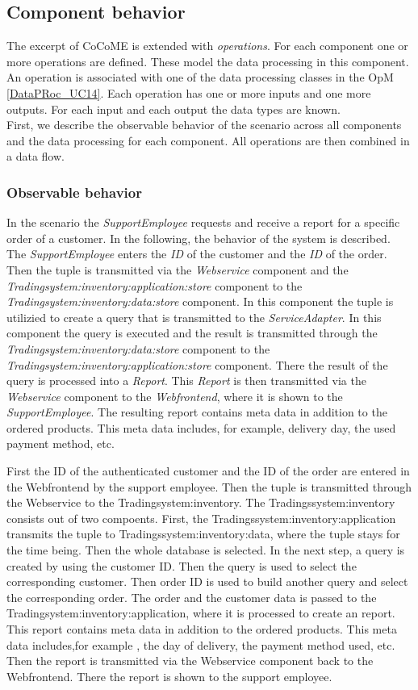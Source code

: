 \subsection{Component behavior}
The excerpt of CoCoME  is extended with \textit{operations}. For each component one or more operations are defined. These model the data processing in this component. An operation is associated with one of the data processing classes in the OpM \autoref{DataPRoc_UC14}. Each operation has one or more inputs and one more outputs. For each input and each output the data types are known. \\
First, we describe the observable behavior of the scenario across all components and the data processing for each component. All operations are then combined in a data flow.
\subsubsection{Observable behavior}
In the scenario the \textit{SupportEmployee} requests and receive a report for a specific order of a customer. In the following, the behavior of the system  is described.\\
The \textit{SupportEmployee} enters the \textit{ID} of the customer and the \textit{ID} of the order. Then the tuple is transmitted via the \textit{Webservice} component and the \textit{Tradingsystem:inventory:application:store} component to the \textit{Tradingsystem:inventory:data:store} component. In this component the tuple is utilizied to create a query that is transmitted to the \textit{ServiceAdapter}. In this component the query is executed and the result is transmitted through the \textit{Tradingsystem:inventory:data:store} component to the \textit{Tradingsystem:inventory:application:store} component. There the result of the query is processed into a \textit{Report}. This \textit{Report} is then transmitted via the \textit{Webservice} component to the \textit{Webfrontend}, where it is shown to the \textit{SupportEmployee}. The resulting report contains meta data in addition to the ordered products. This meta data includes, for example, delivery day, the used payment method, etc.


First the ID of the authenticated customer and the ID of the order are entered in the Webfrontend by the support employee. Then the tuple is transmitted through the Webservice to the Tradingsystem:inventory. The Tradingssystem:inventory consists out of two compoents. First, the Tradingssystem:inventory:application transmits the tuple to Tradingssystem:inventory:data, where the tuple stays for the time being. Then the whole database is selected. In the next step, a query is created by using the customer ID. Then the query is used to select the corresponding customer. Then order ID is used to build another query and select the corresponding order. The order and the customer data is passed to the Tradingsystem:inventory:application, where it is processed to create an report. This report contains meta data in addition to the ordered products. This meta data includes,for example , the day of delivery, the payment method used, etc. Then the report is transmitted via the Webservice component back to the Webfrontend. There the report is shown to the support employee.
